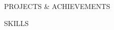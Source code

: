 \documentclass{resume}
\begin{document}
\vspace{\SpacerAboveCategory}
\begin{rSection}{PROJECTS \& ACHIEVEMENTS}
\vspace{\SpacerBelowCategory}








\end{rSection}


\vspace{\SpacerAboveCategory}
\begin{rSection}{SKILLS}
\vspace{\SpacerBelowCategory}


\vspace{\SpacerAboveTopic}

\vspace{\SpacerBelowTopic}

\end{rSection}
\end{document}
